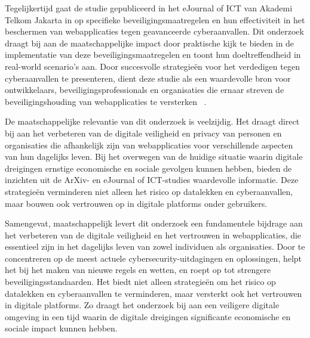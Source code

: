Tegelijkertijd gaat de studie gepubliceerd in het eJournal of ICT van Akademi Telkom Jakarta in op specifieke beveiligingsmaatregelen en hun effectiviteit in 
het beschermen van webapplicaties tegen geavanceerde cyberaanvallen. Dit onderzoek draagt bij aan de maatschappelijke impact door praktische kijk te 
bieden in de implementatie van deze beveiligingsmaatregelen en toont hun doeltreffendheid in real-world scenario's aan. Door succesvolle strategieën voor het 
verdedigen tegen cyberaanvallen te presenteren, dient deze studie als een waardevolle bron voor ontwikkelaars, beveiligingsprofessionals en organisaties
die ernaar streven de beveiligingshouding van webapplicaties te versterken ~\autocite{OlivianaZabka2023}.

De maatschappelijke relevantie van dit onderzoek is veelzijdig. Het draagt direct bij aan het verbeteren van de digitale veiligheid en privacy van personen 
en organisaties die afhankelijk zijn van webapplicaties voor verschillende aspecten van hun dagelijks leven. Bij het overwegen van de huidige situatie waarin 
digitale dreigingen ernstige economische en sociale gevolgen kunnen hebben, bieden de inzichten uit de ArXiv- en eJournal of ICT-studies waardevolle informatie. Deze strategieën 
verminderen niet alleen het risico op datalekken en cyberaanvallen, maar bouwen ook vertrouwen op in digitale platforms onder gebruikers.

Samengevat, maatschappelijk levert dit onderzoek een fundamentele bijdrage aan het verbeteren van de digitale veiligheid en het vertrouwen in webapplicaties, die essentieel 
zijn in het dagelijks leven van zowel individuen als organisaties. Door te concentreren op de meest actuele cybersecurity-uitdagingen en oplossingen, 
helpt het bij het maken van nieuwe regels en wetten, en roept op tot strengere beveiligingsstandaarden. Het biedt niet alleen strategieën om het risico 
op datalekken en cyberaanvallen te verminderen, maar versterkt ook het vertrouwen in digitale platforms. Zo draagt het onderzoek bij aan een veiligere 
digitale omgeving in een tijd waarin de digitale dreigingen significante economische en sociale impact kunnen hebben.
\section{}

